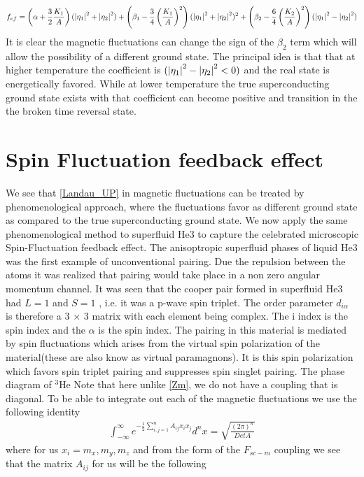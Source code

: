 \documentclass[prl,notitlepage,aps]{revtex4-1}
\begin{document}
\begin{align}
f_{ef}=\left(\alpha + \frac{3}{2}\frac{K_1}{A}\right)(\abs{\eta_1}^2+\abs{\eta_2}^2)+\left(\beta_1-\frac{3}{4}\left(\frac{K_1}{A}\right)^2\right)(\abs{\eta_1}^2+\abs{\eta_2}^2)^2+\left(\beta_2-\frac{6}{4}\left(\frac{K_2}{A}\right)^2\right)(\abs{\eta_1}^2-\abs{\eta_2}^2)
\end{align}
It is clear the magnetic fluctuations can change the sign of the $\beta_2$ term which 			will allow the possibility of a different ground state. The principal idea is that that 	at higher temperature  the coefficient is  $(\abs{\eta_1}^2-\abs{\eta_2}^2<0)$ and the real state is energetically favored. While at lower temperature the true superconducting  ground state exists with that coefficient can become positive and transition in the the broken time reversal state.
\section{Spin Fluctuation feedback effect}
\label{He3}
We see that \ref{Landau_UP} in  magnetic fluctuations can be treated by phenomenological approach, where the fluctuations favor as different ground state as compared to the true superconducting ground state. We now apply the same phenomenological method to superfluid He3 to capture the celebrated microscopic Spin-Fluctuation feedback effect. The anisoptropic superfluid phases of liquid He3 was the first example of unconventional pairing. Due the repulsion between the atoms it was realized that pairing would take place in a non zero angular momentum channel. It was seen that the cooper pair formed in superfluid He3 had $L=1$ and $S=1$ , i.e. it was a p-wave spin triplet. The order parameter $d_{i\alpha}$ is therefore a 3 $\times$ 3 matrix with each element being complex. The i index is the spin index and the $\alpha$ is the spin index. The pairing in this material is mediated by spin fluctuations which arises from the virtual spin polarization of the material(these are also know as virtual paramagnons).  It is this spin polarization which favors spin triplet pairing and suppresses spin singlet pairing. The phase diagram of $^{3}\text{He}$
Note that here unlike \eqref{Zm}, we do not have a coupling that is diagonal. To be able to integrate out each of the magnetic fluctuations we use the following identity 
\begin{align}
\int _{-\infty}^{\infty} e^{-\frac{1}{2}\sum_{i,j=1}^nA_{ij}x_ix_j}d^nx=\sqrt{\frac{(2\pi)^n}{DetA}}
\end{align}
where for us $x_i = m_x,m_y,m_z$ and from the form of the  $F_{sc-m}$ coupling we see that the matrix $A_{ij}$ for us will be the following
\end{document}
